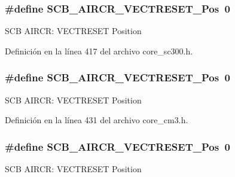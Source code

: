 \subsubsection[{\texorpdfstring{S\+C\+B\+\_\+\+A\+I\+R\+C\+R\+\_\+\+V\+E\+C\+T\+R\+E\+S\+E\+T\+\_\+\+Pos}{SCB_AIRCR_VECTRESET_Pos}}]{\setlength{\rightskip}{0pt plus 5cm}\#define S\+C\+B\+\_\+\+A\+I\+R\+C\+R\+\_\+\+V\+E\+C\+T\+R\+E\+S\+E\+T\+\_\+\+Pos~0}\hypertarget{group___c_m_s_i_s___s_c_b_ga0d483d9569cd9d1b46ec0d171b1f18d8}{}\label{group___c_m_s_i_s___s_c_b_ga0d483d9569cd9d1b46ec0d171b1f18d8}
S\+CB A\+I\+R\+CR\+: V\+E\+C\+T\+R\+E\+S\+ET Position 

Definición en la línea 417 del archivo core\+\_\+sc300.\+h.

\subsubsection[{\texorpdfstring{S\+C\+B\+\_\+\+A\+I\+R\+C\+R\+\_\+\+V\+E\+C\+T\+R\+E\+S\+E\+T\+\_\+\+Pos}{SCB_AIRCR_VECTRESET_Pos}}]{\setlength{\rightskip}{0pt plus 5cm}\#define S\+C\+B\+\_\+\+A\+I\+R\+C\+R\+\_\+\+V\+E\+C\+T\+R\+E\+S\+E\+T\+\_\+\+Pos~0}\hypertarget{group___c_m_s_i_s___s_c_b_ga0d483d9569cd9d1b46ec0d171b1f18d8}{}\label{group___c_m_s_i_s___s_c_b_ga0d483d9569cd9d1b46ec0d171b1f18d8}
S\+CB A\+I\+R\+CR\+: V\+E\+C\+T\+R\+E\+S\+ET Position 

Definición en la línea 431 del archivo core\+\_\+cm3.\+h.

\subsubsection[{\texorpdfstring{S\+C\+B\+\_\+\+A\+I\+R\+C\+R\+\_\+\+V\+E\+C\+T\+R\+E\+S\+E\+T\+\_\+\+Pos}{SCB_AIRCR_VECTRESET_Pos}}]{\setlength{\rightskip}{0pt plus 5cm}\#define S\+C\+B\+\_\+\+A\+I\+R\+C\+R\+\_\+\+V\+E\+C\+T\+R\+E\+S\+E\+T\+\_\+\+Pos~0}\hypertarget{group___c_m_s_i_s___s_c_b_ga0d483d9569cd9d1b46ec0d171b1f18d8}{}\label{group___c_m_s_i_s___s_c_b_ga0d483d9569cd9d1b46ec0d171b1f18d8}
S\+CB A\+I\+R\+CR\+: V\+E\+C\+T\+R\+E\+S\+ET Position 

